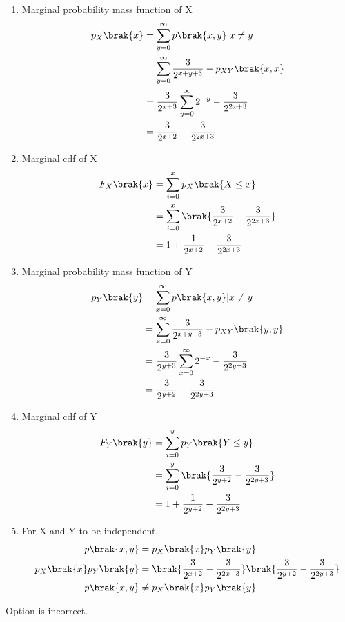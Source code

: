 \documentclass[journal,12pt,twocolumn]{IEEEtran}
\theoremstyle{remark}
\begin{document}
\begin{enumerate}
\item Marginal probability mass function of X
\begin{align}
p_X\brak{x}&=\sum\limits^{\infty}_{y=0}p\brak{x,y} \vert x \neq y\\
&=\sum\limits^{\infty}_{y=0}\frac{3}{2^{x+y+3}}- p_{XY}\brak{x,x}\\
&=\frac{3}{2^{x+3}}\sum\limits^{\infty}_{y=0}2^{-y}-\frac{3}{2^{2x+3}}\\
&=\frac{3}{2^{x+2}}-\frac{3}{2^{2x+3}}
\end{align}
\item Marginal cdf of X
\begin{align}
F_X\brak{x}&=\sum\limits^{x}_{i=0} p_X\brak{X \leq x}\\
&=\sum\limits^{x}_{i=0}\brak{\frac{3}{2^{x+2}}-\frac{3}{2^{2x+3}}}\\
&=1+\frac{1}{2^{x+2}}-\frac{3}{2^{2x+3}}
\end{align}
\item Marginal probability mass function of Y
\begin{align}
p_Y\brak{y}&=\sum\limits^{\infty}_{x=0}p\brak{x,y} \vert x \neq y\\
&=\sum\limits^{\infty}_{x=0}\frac{3}{2^{x+y+3}}- p_{XY}\brak{y,y}\\
&=\frac{3}{2^{y+3}}\sum\limits^{\infty}_{x=0}2^{-x}-\frac{3}{2^{2y+3}}\\
&=\frac{3}{2^{y+2}}-\frac{3}{2^{2y+3}}\\
\end{align}
\item Marginal cdf of Y
\begin{align}
F_Y\brak{y}&=\sum\limits^{y}_{i=0} p_Y\brak{Y \leq y}\\
&=\sum\limits^{y}_{i=0}\brak{\frac{3}{2^{y+2}}-\frac{3}{2^{2y+3}}}\\
&=1+\frac{1}{2^{y+2}}-\frac{3}{2^{2y+3}}
\end{align}
\item For X and Y to be independent,
\begin{align}
p\brak{x,y}&=p_X\brak{x} p_Y\brak{y}\\
p_X\brak{x} p_Y\brak{y}&=\brak{\frac{3}{2^{x+2}}-\frac{3}{2^{2x+3}}}\brak{\frac{3}{2^{y+2}}-\frac{3}{2^{2y+3}}}\\
p\brak{x,y} &\neq p_X\brak{x} p_Y\brak{y}
\end{align}
\end{enumerate}
Option  is incorrect.\\
\end{document}
